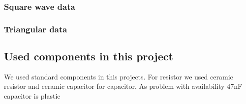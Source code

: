 \documentclass[14pt,a4paper]{extarticle}
\begin{document}
\subsubsection{Square wave data}
\label{sec:org3ea16d8}
\begin{figure}[H] 
\end{figure}  
\subsubsection{Triangular data}
\label{sec:org7d51330}
\subsection{Used components in this project}
\label{sec:org83091b9}

We used standard components in this projects. For resistor we used ceramic resistor and ceramic capacitor for capacitor. As problem with availability 47nF capacitor is plastic 
\end{document}
